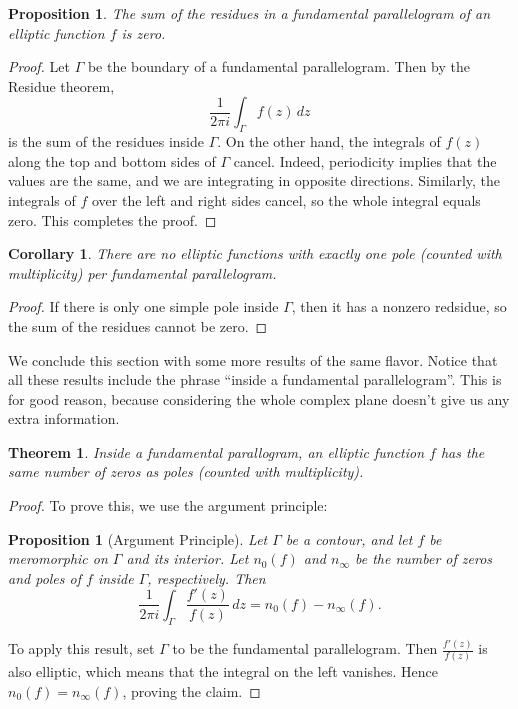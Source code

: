 \documentclass[12pt,reqno]{amsart}
\theoremstyle{plain}
\newtheorem{cor}[thm]{Corollary}
\newtheorem{prop}[thm]{Proposition}
\numberwithin{equation}{section}
\newtheorem{theorem}{Theorem}[section]
\begin{document}
\begin{prop}
    The sum of the residues in a fundamental parallelogram of an elliptic function $f$ is zero.
\end{prop}
\begin{proof}
    Let $\Gamma$ be the boundary of a fundamental parallelogram. Then by the Residue theorem,
    \[\frac{1}{2\pi i} \int_\Gamma f(z)\, dz\]
    is the sum of the residues inside $\Gamma$. On the other hand, the integrals of $f(z)$ along the top and bottom sides of $\Gamma$ cancel. Indeed, periodicity implies that the values are the same, and we are integrating in opposite directions. Similarly, the integrals of $f$ over the left and right sides cancel, so the whole integral equals zero. This completes the proof. 
\end{proof}

\begin{cor}
    There are no elliptic functions with exactly one pole (counted with multiplicity) per fundamental parallelogram.
\end{cor}
\begin{proof}
    If there is only one simple pole inside $\Gamma$, then it has a nonzero redsidue, so the sum of the residues cannot be zero.
\end{proof}

We conclude this section with some more results of the same flavor. Notice that all these results include the phrase ``inside a fundamental parallelogram''. This is for good reason, because considering the whole complex plane doesn't give us any extra information.

\begin{theorem}\label{thm: count zeros and poles}
    Inside a fundamental parallogram, an elliptic function $f$ has the same number of zeros as poles (counted with multiplicity).
\end{theorem}
\begin{proof}
To prove this, we use the argument principle:
\begin{prop}[Argument Principle]
    Let $\Gamma$ be a contour, and let $f$ be meromorphic on $\Gamma$ and its interior. Let $n_0(f)$ and $n_{\infty}$ be the number of zeros and poles of $f$ inside $\Gamma$, respectively. Then
    \[\frac{1}{2\pi i}\int_\Gamma \frac{f'(z)}{f(z)}\, dz = n_0(f) - n_{\infty}(f).\]
\end{prop}
To apply this result, set $\Gamma$ to be the fundamental parallelogram. Then $\frac{f'(z)}{f(z)}$ is also elliptic, which means that the integral on the left vanishes. Hence $n_0(f) = n_\infty (f)$, proving the claim.
\end{proof}
\end{document}
